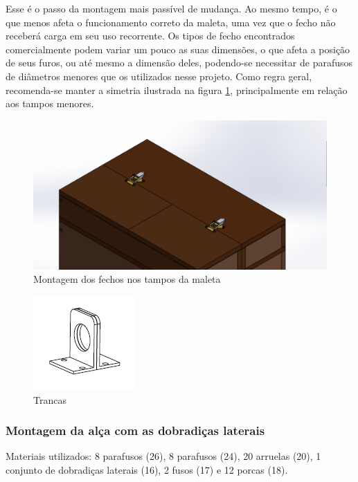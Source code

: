 \par Esse é o passo da montagem mais passível de mudança. Ao mesmo tempo, é o que menos afeta o funcionamento correto da maleta, uma vez que o fecho não receberá carga em seu uso recorrente. Os tipos de fecho encontrados comercialmente podem variar um pouco as suas dimensões, o que afeta a posição de seus furos, ou até mesmo a dimensão deles, podendo-se necessitar de parafusos de diâmetros menores que os utilizados nesse projeto. Como regra geral, recomenda-se manter a simetria ilustrada na figura \ref{fig:fechos},  principalmente em relação aos tampos menores.

\begin{figure}[H]
    \centering
    \includegraphics[width=.7\textwidth]{Figuras/montagemMaletasEstrutura/alimentacaoFechos.png}
    \caption{Montagem dos fechos nos tampos da maleta}
    \label{fig:fechos}
\end{figure}

\begin{figure} [H]
    \centering
    \includegraphics[width=.5\textwidth]{Figuras/suporte/trancas.png}
    \caption{Trancas}
\end{figure}

\subsubsection{Montagem da alça com as dobradiças laterais}

Materiais utilizados: 8 parafusos (26), 8 parafusos (24), 20 arruelas (20), 1 conjunto de dobradiças laterais (16), 2 fusos (17) e 12 porcas (18).

